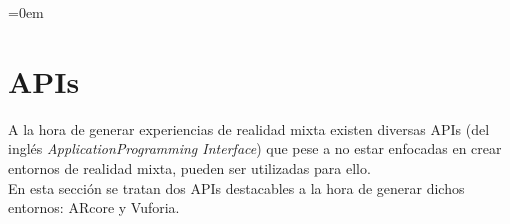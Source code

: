 \parindent=0em
\section{APIs}
\noindent
A la hora de generar experiencias de realidad mixta existen diversas APIs (del inglés \textit{ApplicationProgramming Interface}) que pese a no estar enfocadas en crear entornos de realidad mixta, pueden ser utilizadas para ello.\\

En esta sección se tratan dos APIs destacables a la hora de generar dichos entornos: ARcore y Vuforia.




